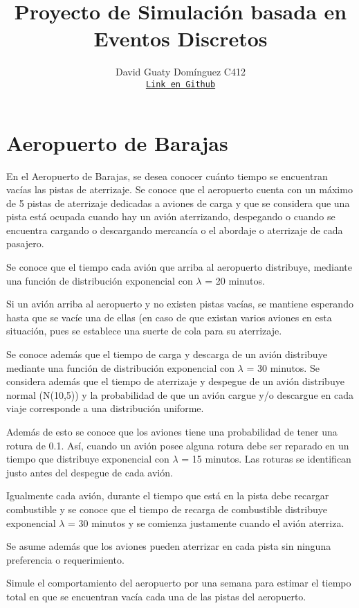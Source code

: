 \documentclass[12pt,letterpaper]{article}
\title{Proyecto de Simulación basada en Eventos Discretos\\}
\author{}
\author{David Guaty Dom\'inguez C412\\
	 \texttt{\href{https://github.com/Gu4ty/Eventos-Discretos}{Link en Github}} }
\date{}
\begin{document}
\maketitle

\section*{Aeropuerto de Barajas}


En el Aeropuerto de Barajas, se desea conocer cuánto tiempo se encuentran vac\'ias las pistas de aterrizaje. Se conoce que el aeropuerto cuenta con un máximo de 5 pistas de aterrizaje dedicadas a aviones de carga y que se considera que una pista está ocupada cuando hay un avión aterrizando, despegando o cuando se encuentra cargando o descargando mercanc\'ia o el abordaje o aterrizaje de cada pasajero.

Se conoce que el tiempo cada avión que arriba al aeropuerto distribuye,
mediante una función de distribución exponencial con $\lambda$ = 20 minutos.

Si un avión arriba al aeropuerto y no existen pistas vac\'ias, se mantiene
esperando hasta que se vac\'ie una de ellas (en caso de que existan varios aviones
en esta situación, pues se establece una suerte de cola para su aterrizaje.

Se conoce además que el tiempo de carga y descarga de un avión distribuye mediante una función de distribución exponencial con $\lambda$ = 30 minutos. Se considera además que el tiempo de aterrizaje y despegue de un avión distribuye normal (N(10,5)) y la probabilidad de que un avión cargue y/o descargue en cada viaje corresponde a una distribución uniforme.

Además de esto se conoce que los aviones tiene una probabilidad de tener
una rotura de 0.1. As\'i, cuando un avión posee alguna rotura debe ser reparado en un tiempo que distribuye exponencial con $\lambda$ = 15 minutos. Las roturas se identifican justo antes del despegue de cada avión. 

Igualmente cada avión, durante el tiempo que está en la pista debe recargar combustible y se conoce que el tiempo de recarga de combustible distribuye exponencial $\lambda$ = 30 minutos y se comienza justamente cuando el avión aterriza.

Se asume además que los aviones pueden aterrizar en cada pista sin ninguna preferencia o requerimiento.

Simule el comportamiento del aeropuerto por una semana para estimar el
tiempo total en que se encuentran vac\'ia cada una de las pistas del aeropuerto.
\end{document}
